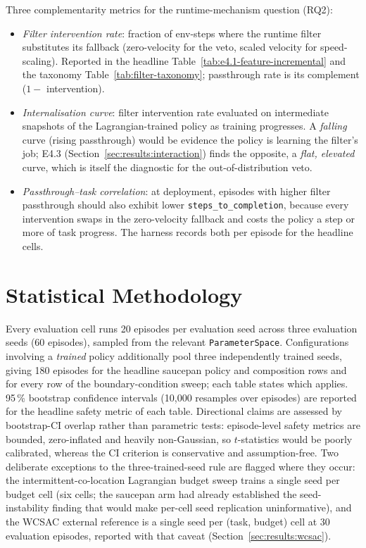 \documentclass[11pt,a4paper]{report}
\begin{document}
Three complementarity metrics for the runtime-mechanism question
(RQ2):
\begin{itemize}[topsep=2pt,itemsep=1pt]
\item \emph{Filter intervention rate}: fraction of env-steps where
  the runtime filter substitutes its fallback (zero-velocity for the
  veto, scaled velocity for speed-scaling). Reported in the headline
  Table~\ref{tab:e4.1-feature-incremental} and the taxonomy
  Table~\ref{tab:filter-taxonomy}; passthrough rate is its complement
  ($1 -$ intervention).
\item \emph{Internalisation curve}: filter intervention rate
  evaluated on intermediate snapshots of the Lagrangian-trained
  policy as training progresses. A \emph{falling} curve (rising
  passthrough) would be evidence the policy is learning the filter's
  job; E4.3 (Section~\ref{sec:results:interaction}) finds the opposite,
  a \emph{flat, elevated} curve, which is itself the diagnostic for the
  out-of-distribution veto.
\item \emph{Passthrough--task correlation}: at deployment, episodes
  with higher filter passthrough should also exhibit lower
  \texttt{steps\_to\_completion}, because every intervention swaps
  in the zero-velocity fallback and costs the policy a step or
  more of task progress. The harness records both per episode for
  the headline cells.
\end{itemize}

\section{Statistical Methodology}
\label{sec:setup:stats}

Every evaluation cell runs 20 episodes per evaluation seed across
three evaluation seeds (60 episodes), sampled from the relevant
\texttt{ParameterSpace}. Configurations involving a \emph{trained}
policy additionally pool three independently trained seeds, giving
180 episodes for the headline saucepan policy and composition rows
and for every row of the boundary-condition sweep; each table states
which applies. 95\,\% bootstrap confidence intervals (10{,}000
resamples over episodes) are reported for the headline safety
metric of each table. Directional claims are assessed by
bootstrap-CI overlap rather than parametric tests: episode-level
safety metrics are bounded, zero-inflated and heavily non-Gaussian,
so $t$-statistics would be poorly calibrated, whereas the CI
criterion is conservative and assumption-free. Two deliberate
exceptions to the three-trained-seed rule are flagged where they
occur: the intermittent-co-location Lagrangian budget sweep trains a
single seed per budget cell (six cells; the saucepan arm had already
established the seed-instability finding that would make per-cell
seed replication uninformative), and the WCSAC external reference is
a single seed per (task, budget) cell at 30 evaluation episodes,
reported with that caveat (Section~\ref{sec:results:wcsac}).
\end{document}
